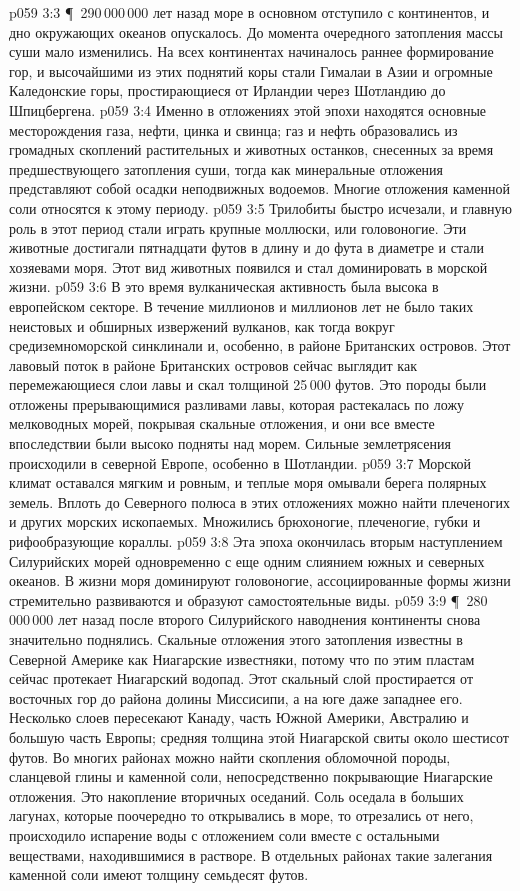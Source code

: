 \vs p059 3:3 \P\ 290\,000\,000 лет назад море в основном отступило с континентов, и дно окружающих океанов опускалось. До момента очередного затопления массы суши мало изменились. На всех континентах начиналось раннее формирование гор, и высочайшими из этих поднятий коры стали Гималаи в Азии и огромные Каледонские горы, простирающиеся от Ирландии через Шотландию до Шпицбергена.
\vs p059 3:4 Именно в отложениях этой эпохи находятся основные месторождения газа, нефти, цинка и свинца; газ и нефть образовались из громадных скоплений растительных и животных останков, снесенных за время предшествующего затопления суши, тогда как минеральные отложения представляют собой осадки неподвижных водоемов. Многие отложения каменной соли относятся к этому периоду.
\vs p059 3:5 Трилобиты быстро исчезали, и главную роль в этот период стали играть крупные моллюски, или головоногие. Эти животные достигали пятнадцати футов в длину и до фута в диаметре и стали хозяевами моря. Этот вид животных появился  и стал доминировать в морской жизни.
\vs p059 3:6 В это время вулканическая активность была высока в европейском секторе. В течение миллионов и миллионов лет не было таких неистовых и обширных извержений вулканов, как тогда вокруг средиземноморской синклинали и, особенно, в районе Британских островов. Этот лавовый поток в районе Британских островов сейчас выглядит как перемежающиеся слои лавы и скал толщиной 25\,000 футов. Это породы были отложены прерывающимися разливами лавы, которая растекалась по ложу мелководных морей, покрывая скальные отложения, и они все вместе впоследствии были высоко подняты над морем. Сильные землетрясения происходили в северной Европе, особенно в Шотландии.
\vs p059 3:7 Морской климат оставался мягким и ровным, и теплые моря омывали берега полярных земель. Вплоть до Северного полюса в этих отложениях можно найти плеченогих и других морских ископаемых. Множились брюхоногие, плеченогие, губки и рифообразующие кораллы.
\vs p059 3:8 Эта эпоха окончилась вторым наступлением Силурийских морей одновременно с еще одним слиянием южных и северных океанов. В жизни моря доминируют головоногие, ассоциированные формы жизни стремительно развиваются и образуют самостоятельные виды.
\vs p059 3:9 \P\ 280\,000\,000 лет назад после второго Силурийского наводнения континенты снова значительно поднялись. Скальные отложения этого затопления известны в Северной Америке как Ниагарские известняки, потому что по этим пластам сейчас протекает Ниагарский водопад. Этот скальный слой простирается от восточных гор до района долины Миссисипи, а на юге даже западнее его. Несколько слоев пересекают Канаду, часть Южной Америки, Австралию и большую часть Европы; средняя толщина этой Ниагарской свиты около шестисот футов. Во многих районах можно найти скопления обломочной породы, сланцевой глины и каменной соли, непосредственно покрывающие Ниагарские отложения. Это накопление вторичных оседаний. Соль оседала в больших лагунах, которые поочередно то открывались в море, то отрезались от него, происходило испарение воды с отложением соли вместе с остальными веществами, находившимися в растворе. В отдельных районах такие залегания каменной соли имеют толщину семьдесят футов.
